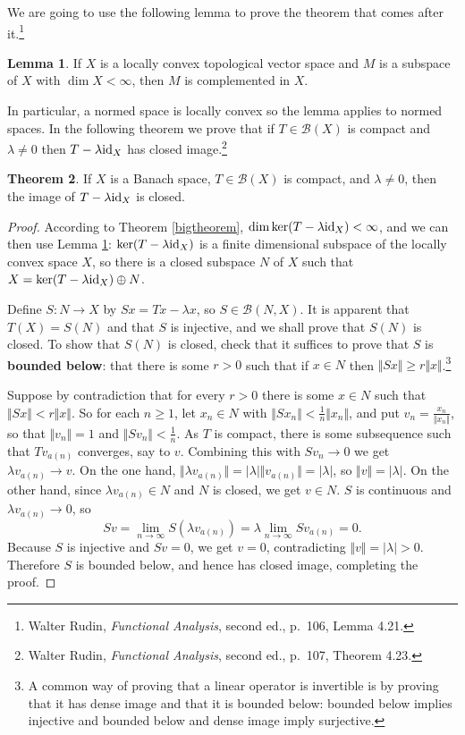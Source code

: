 \documentclass{article}
\newcommand{\id}{\ensuremath\mathrm{id}}
\newcommand{\norm}[1]{\Vert #1 \Vert}
\theoremstyle{definition}
\newtheorem{theorem}{Theorem}
\newtheorem{lemma}[theorem]{Lemma}
\begin{document}
We are going to use the following lemma to prove the theorem that comes after it.\footnote{Walter Rudin,
{\em Functional Analysis}, second ed., p.~106, Lemma 4.21.} 

\begin{lemma}
If $X$ is a locally convex topological vector space and $M$ is a  subspace of $X$ with
$\dim X < \infty$, then $M$ is complemented in $X$.
\label{complementlemma}
\end{lemma}

In particular, a normed space is locally convex so the lemma applies to normed spaces. In the following theorem we prove
that 
if $T \in \mathscr{B}(X)$ is compact and $\lambda \neq 0$ then $T-\lambda \id_X$ has closed image.\footnote{Walter Rudin, {\em Functional Analysis}, second ed., p.~107, Theorem 4.23.}

\begin{theorem}
If $X$ is a Banach space, $T \in \mathscr{B}(X)$ is compact, and $\lambda \neq 0$, then the image of 
$T-\lambda \id_X$ is closed.
\label{closedimage}
\end{theorem}
\begin{proof}
According to Theorem \ref{bigtheorem}, $\dim \ker(T-\lambda \id_X)< \infty$, and we can then  use
Lemma \ref{complementlemma}: $\ker(T-\lambda \id_X)$ is a finite dimensional subspace of the locally convex space
$X$, so there is a closed subspace $N$ of $X$ such that $X = \ker(T-\lambda \id_X) \oplus N$.

Define $S:N \to X$ by $Sx = Tx-\lambda x$, so $S \in \mathscr{B}(N,X)$.
It is apparent that $T(X)=S(N)$ and that $S$ is injective, and we shall prove that $S(N)$ is closed.
To show that $S(N)$ is closed, check that it suffices to prove that $S$ is \textbf{bounded below}: that there is some $r>0$
such that if $x \in N$ then $\norm{Sx} \geq r\norm{x}$.\footnote{A common way of proving that a linear operator is invertible is by
proving that it has dense image and that it is bounded below: bounded below implies injective and bounded below
and dense image imply surjective.} 
 
Suppose by contradiction that for every $r>0$ there is some $x \in N$ such that $\norm{Sx}<r\norm{x}$. 
So for each $n \geq 1$, let $x_n \in N$ with $\norm{Sx_n}< \frac{1}{n} \norm{x_n}$, and put
$v_n = \frac{x_n}{\norm{x_n}}$, so that $\norm{v_n}=1$ and $\norm{Sv_n}<\frac{1}{n}$.
As $T$ is compact, there is some subsequence such that $Tv_{a(n)}$ converges, say to $v$.
Combining this with $Sv_n \to 0$ we get $\lambda v_{a(n)} \to v$.
On the one hand, $\norm{\lambda v_{a(n)}} = |\lambda| \norm{v_{a(n)}} = |\lambda|$, so $\norm{v} = |\lambda|$.
On the other hand,
since $\lambda v_{a(n)} \in N$ and $N$ is closed,
we get $v \in N$. $S$ is continuous and $\lambda v_{a(n)} \to 0$, so
\[
Sv = \lim_{n \to \infty} S(\lambda v_{a(n)}) = \lambda \lim_{n \to \infty} Sv_{a(n)} = 0.
\]
Because $S$ is injective and $Sv=0$, we get $v=0$, contradicting $\norm{v}=|\lambda|>0$. Therefore $S$
is bounded below, and hence has closed image, completing the proof.
\end{proof}
\end{document}
